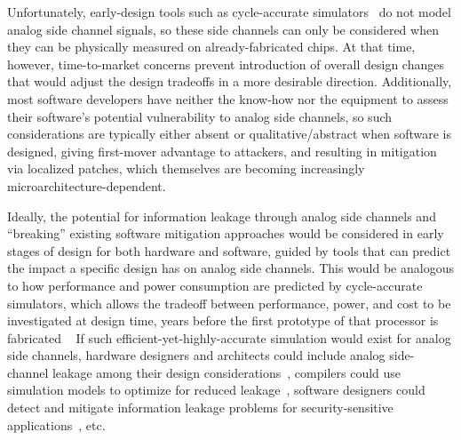 \documentclass[11 pt]{article}
\begin{document}
Unfortunately, early-design tools such as cycle-accurate simulators~\cite{Li:2009:MIP:1669112.1669172,Li:2011:CAM:2132325.2132479,509850,Ardestani:2013:EFM:2495252.2495480,Binkert:2011:GS:2024716.2024718,sesc,5982026,carlson2014aeohmcm}  do not model analog side channel signals, so these side channels can only be considered when they can be physically measured on already-fabricated chips. At that time, however, time-to-market concerns prevent introduction of overall design changes that would adjust the design tradeoffs in a more desirable direction. Additionally, most software developers have neither the know-how nor the equipment to assess their software’s potential vulnerability to analog side channels, so such considerations are typically either absent or qualitative/abstract when software is designed, giving first-mover advantage to attackers, and resulting in mitigation via localized patches, which themselves are becoming increasingly microarchitecture-dependent.

Ideally, the potential for information leakage through analog side channels and ``breaking'' existing software mitigation approaches would be considered in early stages of design for both hardware and software, guided by tools that can predict the impact a specific design has on analog side channels. This would be analogous to how performance and power consumption are predicted by cycle-accurate simulators, which allows the tradeoff between performance, power, and cost to be investigated at design time, years before the first prototype of that processor is fabricated ~\cite{Li:2009:MIP:1669112.1669172,Li:2011:CAM:2132325.2132479,509850,Ardestani:2013:EFM:2495252.2495480,Binkert:2011:GS:2024716.2024718,sesc,5982026,carlson2014aeohmcm} If such efficient-yet-highly-accurate simulation would exist for analog side channels, hardware designers and architects could include analog side-channel leakage among their design considerations~\cite{8416860,Althoff:2018:HII:3276539.3276601,Andrysco:2018:TVC:3243734.3243766,cryptoeprint:2018:808,Rane:2016:SPF:3241094.3241101,nayak2017hop}, compilers could use simulation models to optimize for reduced leakage~\cite{Liu:2015:GHS:2694344.2694385,Rane:2015:RCD:2831143.2831171,Gorman:2017:AON:3123939.3123973}, software designers could detect and mitigate information leakage problems for security-sensitive applications~\cite{Wichelmann:2018:MFF:3274694.3274741,Chen:2017:PDS:3133956.3134058,Wu:2018:ETS:3213846.3213851}, etc.
\end{document}
